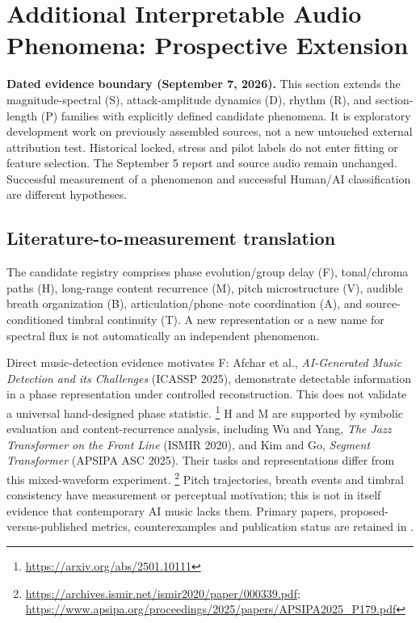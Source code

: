 \section{Additional Interpretable Audio Phenomena: Prospective Extension}
\label{sec:additional-phenomena}

\noindent\textbf{Dated evidence boundary (September 7, 2026).}
This section extends the magnitude-spectral (S), attack-amplitude dynamics (D),
rhythm (R), and section-length (P) families with explicitly defined candidate
phenomena. It is exploratory development work on previously assembled sources,
not a new untouched external attribution test. Historical locked, stress and
pilot labels do not enter fitting or feature selection. The September 5 report
and source audio remain unchanged. Successful measurement of a phenomenon and
successful Human/AI classification are different hypotheses.

\subsection{Literature-to-measurement translation}

The candidate registry comprises phase evolution/group delay (F), tonal/chroma
paths (H), long-range content recurrence (M), pitch microstructure (V), audible
breath organization (B), articulation/phone--note coordination (A), and
source-conditioned timbral continuity (T). A new representation or a new name
for spectral flux is not automatically an independent phenomenon.

Direct music-detection evidence motivates F: Afchar et al.,
\emph{AI-Generated Music Detection and its Challenges} (ICASSP 2025), demonstrate
detectable information in a phase representation under controlled reconstruction.
This does not validate a universal hand-designed phase statistic.
\footnote{\url{https://arxiv.org/abs/2501.10111}}
H and M are supported by symbolic evaluation and content-recurrence analysis,
including Wu and Yang, \emph{The Jazz Transformer on the Front Line} (ISMIR 2020),
and Kim and Go, \emph{Segment Transformer} (APSIPA ASC 2025). Their tasks and
representations differ from this mixed-waveform experiment.
\footnote{\url{https://archives.ismir.net/ismir2020/paper/000339.pdf};
\url{https://www.apsipa.org/proceedings/2025/papers/APSIPA2025_P179.pdf}}
Pitch trajectories, breath events and timbral consistency have measurement or
perceptual motivation; this is not in itself evidence that contemporary AI
music lacks them. Primary papers, proposed-versus-published metrics, counterexamples
and publication status are retained in
.

